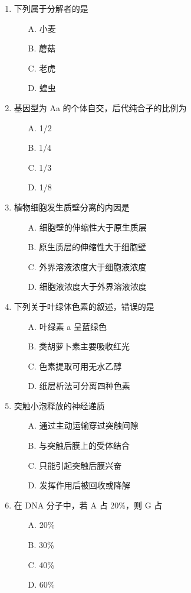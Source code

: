 \begin{enumerate}
  \item 下列属于分解者的是
  \begin{enumerate}
    \item[A.] 小麦
    \item[B.] 蘑菇
    \item[C.] 老虎
    \item[D.] 蝗虫
  \end{enumerate}

  \item 基因型为 Aa 的个体自交，后代纯合子的比例为
  \begin{enumerate}
    \item[A.] 1/2
    \item[B.] 1/4
    \item[C.] 1/3
    \item[D.] 1/8
  \end{enumerate}

  \item 植物细胞发生质壁分离的内因是
  \begin{enumerate}
    \item[A.] 细胞壁的伸缩性大于原生质层
    \item[B.] 原生质层的伸缩性大于细胞壁
    \item[C.] 外界溶液浓度大于细胞液浓度
    \item[D.] 细胞液浓度大于外界溶液浓度
  \end{enumerate}

  \item 下列关于叶绿体色素的叙述，错误的是
  \begin{enumerate}
    \item[A.] 叶绿素 a 呈蓝绿色
    \item[B.] 类胡萝卜素主要吸收红光
    \item[C.] 色素提取可用无水乙醇
    \item[D.] 纸层析法可分离四种色素
  \end{enumerate}

  \item 突触小泡释放的神经递质
  \begin{enumerate}
    \item[A.] 通过主动运输穿过突触间隙
    \item[B.] 与突触后膜上的受体结合
    \item[C.] 只能引起突触后膜兴奋
    \item[D.] 发挥作用后被回收或降解
  \end{enumerate}

  \item 在 DNA 分子中，若 A 占 20\%，则 G 占
  \begin{enumerate}
    \item[A.] 20\%
    \item[B.] 30\%
    \item[C.] 40\%
    \item[D.] 60\%
  \end{enumerate}
\end{enumerate}


